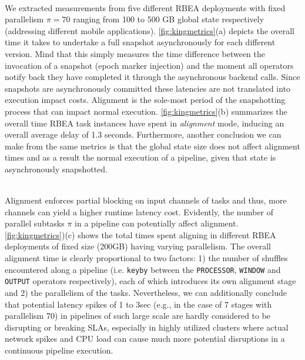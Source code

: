  \\
We extracted measurements from five different RBEA deployments with fixed parallelism $\pi = 70$ ranging from 100 to 500 GB global state respectively (addressing different mobile applications). \autoref{fig:kingmetrics}(a) depicts the overall time it takes to undertake a full snapshot asynchronously for each different version. Mind that this simply measures the time difference between the invocation of a snapshot (epoch marker injection) and the moment all operators notify back they have completed it through the asynchronous backend calls. Since snapshots are asynchronously committed these latencies are not translated into execution impact costs. Alignment is the sole-most period of the snapshotting process that can impact normal execution. \autoref{fig:kingmetrics}(b) summarizes the overall time RBEA task instances have spent in \emph{alignment} mode, inducing an overall average delay of 1.3 seconds. Furthermore, another conclusion we can make from the same metrics is that the global state size does not affect alignment times and as a result the normal execution of a pipeline, given that state is asynchronously snapshotted.

 \\
Alignment enforces partial blocking  on input channels of tasks and thus, more channels can yield a higher runtime latency cost. Evidently, the number of parallel subtasks $\pi$ in a pipeline can potentially affect alignment. \autoref{fig:kingmetrics})(c) shows the total times spent aligning in different RBEA deployments of fixed size (200GB) having varying parallelism. The overall alignment time is clearly proportional to two factors: 1) the number of shuffles encountered along a pipeline (i.e. \texttt{keyby} between the \texttt{PROCESSOR}, \texttt{WINDOW} and \texttt{OUTPUT} operators respectively), each of which introduces its own alignment stage and 2) the parallelism of the tasks. Nevertheless, we can additionally conclude that potential latency spikes of 1 to 3sec (e.g., in the case of 7 stages with parallelism 70) in pipelines of such large scale are hardly considered to be disrupting or breaking SLAs, especially in highly utilized clusters where actual network spikes and CPU load can cause much more potential disruptions in a continuous pipeline execution.